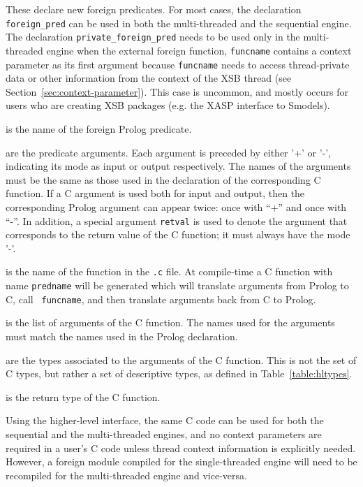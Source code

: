 \begin{description}

%
These declare new foreign predicates.  For most cases, the declaration
{\tt foreign\_pred} can be used in both the multi-threaded and the
sequential engine.  The declaration {\tt private\_foreign\_pred} needs
to be used only in the multi-threaded engine when the external foreign
function, {\tt funcname} contains a context parameter as its first
argument because {\tt funcname} needs to access thread-private data or
other information from the context of the XSB thread (see
Section~\ref{sec:context-parameter}).  This case is uncommon, and
mostly occurs for users who are creating XSB packages (e.g. the XASP
interface to Smodels).

 is the name of the foreign Prolog predicate. 

 are the predicate arguments. Each argument
is preceded by either '+' or '-', indicating its mode as input or
output respectively. The names of the arguments must be the same as
those used in the declaration of the corresponding C function. If a C
argument is used both for input and output, then the corresponding
Prolog argument can appear twice: once with ``+'' and once with ``-''.
In addition, a special argument \texttt{retval} is used to denote the
argument that corresponds to the return value of the C function; it
must always have the mode '-'.

 is the name of the function in the {\tt .c} file.
At compile-time a C function with name {\tt predname} will be
generated which will translate arguments from Prolog to C, call {\tt
  funcname}, and then translate arguments back from C to Prolog.

 is the list of arguments of the C
function. The names used for the arguments must match the names used
in the Prolog declaration.

 are the types associated to the arguments of
the C function. This is not the set of C types, but rather a set of
descriptive types, as defined in Table~\ref{table:hltypes}.

 is the return type of the C function.

\end{description}

Using the higher-level interface, the same C code can be used for both
the sequential and the multi-threaded engines, and no context
parameters are required in a user's C code unless thread context
information is explicitly needed.  However, a foreign module compiled
for the single-threaded engine will need to be recompiled for the
multi-threaded engine and vice-versa.

